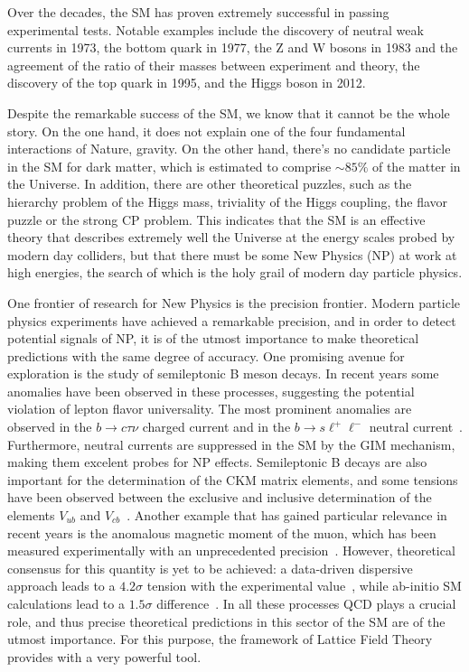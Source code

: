 Over the decades, the SM has proven extremely successful in passing experimental tests. Notable examples include the discovery of neutral weak currents in 1973, the bottom quark in 1977, the Z and W bosons in 1983 and the agreement of the ratio of their masses between experiment and theory, the discovery of the top quark in 1995, and the Higgs boson in 2012. 

Despite the remarkable success of the SM, we know that it cannot be the whole story. On the one hand, it does not explain one of the four fundamental interactions of Nature, gravity. On the other hand, there's no candidate particle in the SM for dark matter, which is estimated to comprise $\sim85\%$ of the matter in the Universe. In addition, there are other theoretical puzzles, such as the hierarchy problem of the Higgs mass, triviality of the Higgs coupling, the flavor puzzle or the strong CP problem. This indicates that the SM is an effective theory that describes extremely well the Universe at the energy scales probed by modern day colliders, but that there must be some New Physics (NP) at work at high energies, the search of which is the holy grail of modern day particle physics. 

One frontier of research for New Physics is the precision frontier. Modern particle physics experiments have achieved a remarkable precision, and in order to detect potential signals of NP, it is of the utmost importance to make theoretical predictions with the same degree of accuracy. One promising avenue for exploration is the study of semileptonic B meson decays. In recent years some anomalies have been observed in these processes, suggesting the potential violation of lepton flavor universality. The most prominent anomalies are observed in the $b\to c\tau\nu$ charged current and in the $b\to s\ell^+\ell^-$ neutral current~\citep{Capdevila:2023yhq}. Furthermore, neutral currents are suppressed in the SM by the GIM mechanism, making them excelent probes for NP effects. Semileptonic B decays are also important for the determination of the CKM matrix elements, and some tensions have been observed between the exclusive and inclusive determination of the elements $V_{ub}$ and $V_{cb}$~\citep{Ricciardi:2019zph}. Another example that has gained particular relevance in recent years is the anomalous magnetic moment of the muon, which has been measured experimentally with an unprecedented precision~\citep{Muong-2:2006rrc}. However, theoretical consensus for this quantity is yet to be achieved: a data-driven dispersive approach leads to a $4.2\sigma$ tension with the experimental value~\citep{Aoyama:2020ynm}, while ab-initio SM calculations lead to a $1.5\sigma$ difference~\citep{Borsanyi:2020mff}. In all these processes QCD plays a crucial role, and thus precise theoretical predictions in this sector of the SM are of the utmost importance. For this purpose, the framework of Lattice Field Theory provides with a very powerful tool.


